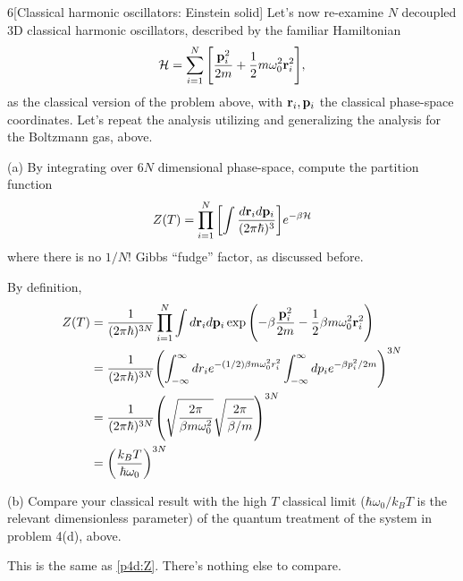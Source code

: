 \documentclass[12pt]{article}
\begin{document}
\begin{problem}{6}[Classical harmonic oscillators: Einstein solid]
Let's now re-examine $N$ decoupled 3D classical harmonic oscillators, described
by the familiar Hamiltonian
\begin{equation}
    \mathcal{H}=\sum_{i=1}^N\qty[\frac{\vb{p}_i^2}{2m}+\frac12m\omega_0^2\vb{r}_i^2] ,
\end{equation}
as the classical version of the problem above, with $\vb{r}_i,\vb{p}_i$ the
classical phase-space coordinates. Let's repeat the analysis utilizing and
generalizing the analysis for the Boltzmann gas, above.

(a) By integrating over $6N$ dimensional phase-space, compute the partition
function
\begin{equation}
   Z(T)=\prod_{i=1}^N\qty[\int\frac{d\vb{r}_id\vb{p}_i}{(2\pi\hbar)^3}]e^{-\beta\mathcal{H}} 
\end{equation}
where there is no $1/N!$ Gibbs ``fudge'' factor, as discussed before.
\begin{solution}
By definition,
\begin{align}
    Z(T)
    &=\frac1{(2\pi\hbar)^{3N}}\prod_{i=1}^N\int d\vb{r}_id\vb{p}_i
    \exp\qty(-\beta\frac{\vb{p}_i^2}{2m}-\frac12\beta
    m\omega_0^2\vb{r}_i^2)\notag\\
    &=\frac1{(2\pi\hbar)^{3N}}\qty(\int_{-\infty}^\infty dr_ie^{-(1/2)\beta
    m\omega_0^2r_i^2}\int_{-\infty}^\infty dp_ie^{-\beta p_i^2/2m})^{3N}\notag\\
    &=\frac1{(2\pi\hbar)^{3N}}\qty(\sqrt{\frac{2\pi}{\beta
    m\omega_0^2}}\sqrt{\frac{2\pi}{\beta/m}})^{3N}\notag\\
    &=\qty(\frac{k_BT}{\hbar\omega_0})^{3N}
\end{align}
\end{solution}

(b) Compare your classical result with the high $T$ classical limit
($\hbar\omega_0/k_BT$ is the relevant dimensionless parameter) of the quantum
treatment of the system in problem 4(d), above.
\begin{solution}
    This is the same as \eqref{p4d:Z}. There's nothing else to compare.
\end{solution}


\end{problem}
\end{document}
